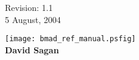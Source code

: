 \thispagestyle{empty}

\begin{flushright}
\large
  Revision: 1.1 \\
  5 August, 2004 \\
\end{flushright}

\vfill

{
\begin{center}
\texttt{[image: bmad\_ref\_manual.psfig]} \\
\vskip 0.3in
\huge\bf David Sagan
\end{center}
}


\vfill
\break